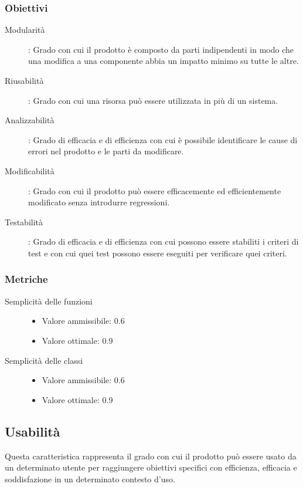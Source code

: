 \documentclass[../piano-di-qualifica.tex]{subfiles}
\begin{document}
\subsubsection{Obiettivi}%
\label{subs:obiettivi}
      \begin{description}
        \item [Modularità]: Grado con cui il prodotto è composto da parti indipendenti in modo che una modifica a una componente abbia un impatto minimo su tutte le altre.
        \item [Riusabilità]: Grado con cui una risorsa può essere utilizzata in più di un sistema.
        \item [Analizzabilità]: Grado di efficacia e di efficienza con cui è possibile identificare le cause di errori nel prodotto e le parti da modificare.
        \item [Modificabilità]: Grado con cui il prodotto può essere efficacemente ed efficientemente modificato senza introdurre regressioni.
        \item [Testabilità]: Grado di efficacia e di efficienza con cui possono essere stabiliti i criteri di test e con cui quei test possono essere eseguiti per verificare quei criteri.
      \end{description}

\subsubsection{Metriche}%
\label{subs:metriche}
  \begin{description}
    \item [Semplicità delle funzioni]
      \begin{itemize} \item Valore ammissibile: 0.6 \item Valore ottimale: 0.9 \end{itemize}
    \item [Semplicità delle classi]
      \begin{itemize} \item Valore ammissibile: 0.6 \item Valore ottimale: 0.9 \end{itemize}
  \end{description}


\subsection{Usabilità}%
\label{sub:usabilita}
Questa caratteristica rappresenta il grado con cui il prodotto può essere usato da un determinato utente per raggiungere obiettivi specifici con efficienza, efficacia e soddisfazione in un determinato contesto d'uso.
\end{document}
